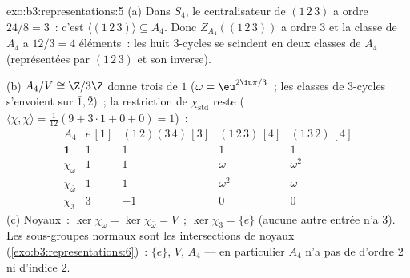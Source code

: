 \begin{solution}{exo:b3:representations:5}
(a) Dans $S_4$, le centralisateur de $(1\,2\,3)$ a ordre $24/8
= 3$~: c'est $\langle(1\,2\,3)\rangle \subseteq A_4$. Donc
$Z_{A_4}((1\,2\,3))$ a ordre $3$ et la classe de $A_4$ a $12/3
= 4$ éléments~: les huit $3$-cycles se scindent en deux classes
de $A_4$ (représentées par $(1\,2\,3)$ et son inverse).

(b) $A_4/V \cong \Z/3\Z$ donne trois  de  $1$
($\omega = \eu^{2\iu\pi/3}$~; les classes de $3$-cycles s'envoient
sur $\bar1, \bar2$)~; la restriction de $\chi_{\mathrm{std}}$
reste  ($\langle\chi,\chi\rangle = \frac1{12}(9 + 3
\cdot 1 + 0 + 0) = 1$)~:
\[
\begin{array}{c|cccc}
A_4 & e\,[1] & (1\,2)(3\,4)\,[3] & (1\,2\,3)\,[4] &
(1\,3\,2)\,[4]\\
\hline
\mathbf 1 & 1 & 1 & 1 & 1\\
\chi_\omega & 1 & 1 & \omega & \omega^2\\
\chi_{\bar\omega} & 1 & 1 & \omega^2 & \omega\\
\chi_3 & 3 & -1 & 0 & 0
\end{array}
\]
(c) Noyaux~: $\ker\chi_\omega = \ker\chi_{\bar\omega} = V$~;
$\ker\chi_3 = \{e\}$ (aucune autre entrée n'a  $3$). Les
sous-groupes normaux sont les intersections de noyaux
(\cref{exo:b3:representations:6})~: $\{e\}$, $V$, $A_4$ --- en
particulier $A_4$ n'a pas de  d'ordre $2$ ni
d'indice $2$.
\end{solution}

